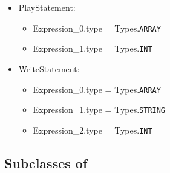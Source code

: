 \begin{itemize}
\begin{itemize}
		\end{itemize}
	\item PlayStatement:
		\begin{itemize}
			\item Expression\_0.type = Types.\texttt{ARRAY}
			\item Expression\_1.type = Types.\texttt{INT}
		\end{itemize}
	\item WriteStatement:
		\begin{itemize}
			\item Expression\_0.type = Types.\texttt{ARRAY}
			\item Expression\_1.type = Types.\texttt{STRING}
			\item Expression\_2.type = Types.\texttt{INT}
		\end{itemize}
\end{itemize}

\subsection{Subclasses of }